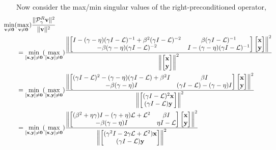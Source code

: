 \documentclass[a4paper,10pt]{article}
\begin{document}
%
Now consider the max/min singular values of the right-preconditioned operator,
%
\begin{align*}
&\hspace{-5ex} \min_{\mathbf{v}\neq\mathbf{0}} (\max_{\mathbf{v}\neq\mathbf{0}})
	\frac{\|\mathcal{P}_\gamma^R\mathbf{v}\|^2}{\|\mathbf{v}\|^2} \\
& = \min_{[\mathbf{x},\mathbf{y}]\neq\mathbf{0}} (\max_{[\mathbf{x},\mathbf{y}]\neq\mathbf{0}})
	\frac{ \left\| \begin{bmatrix} I - (\gamma -\eta )(\gamma I - \mathcal{L})^{-1} +
			\beta^2(\gamma I - \mathcal{L})^{-2} & 
		\beta (\gamma I - \mathcal{L})^{-1} \\
		-\beta (\gamma -\eta )(\gamma I - \mathcal{L})^{-2} & 
		I - (\gamma -\eta )(\gamma I - \mathcal{L})^{-1}
	\end{bmatrix}
	\begin{bmatrix} \mathbf{x} \\ \mathbf{y}\end{bmatrix} \right\|^2}
	{ \left\| \begin{bmatrix} \mathbf{x} \\ \mathbf{y}\end{bmatrix} \right\|^2} \\
& = \min_{[\mathbf{x},\mathbf{y}]\neq\mathbf{0}} (\max_{[\mathbf{x},\mathbf{y}]\neq\mathbf{0}})
	\frac{ \left\| \begin{bmatrix} (\gamma I - \mathcal{L})^2 -
		(\gamma -\eta )(\gamma I - \mathcal{L}) +
			\beta^2 I & 
		\beta I  \\
		-\beta (\gamma -\eta ) I & 
		(\gamma I - \mathcal{L}) - (\gamma -\eta )I
	\end{bmatrix}
	\begin{bmatrix} \mathbf{x} \\ \mathbf{y}\end{bmatrix} \right\|^2}
	{ \left\| \begin{bmatrix} (\gamma I - \mathcal{L})^2 \mathbf{x} \\
		(\gamma I - \mathcal{L}) \mathbf{y}\end{bmatrix} \right\|^2} \\
& = \min_{[\mathbf{x},\mathbf{y}]\neq\mathbf{0}} (\max_{[\mathbf{x},\mathbf{y}]\neq\mathbf{0}})
	\frac{ \left\| \begin{bmatrix} (\beta^2+\eta\gamma)I - (\gamma+\eta)\mathcal{L} + \mathcal{L}^2& 
		\beta I  \\ -\beta (\gamma -\eta ) I & \eta I - \mathcal{L}
	\end{bmatrix}
	\begin{bmatrix} \mathbf{x} \\ \mathbf{y}\end{bmatrix} \right\|^2}
	{ \left\| \begin{bmatrix} (\gamma^2 I - 2 \gamma\mathcal{L} + \mathcal{L}^2) \mathbf{x} \\
		(\gamma I - \mathcal{L}) \mathbf{y}\end{bmatrix} \right\|^2} \\
\end{align*}
\end{document}
